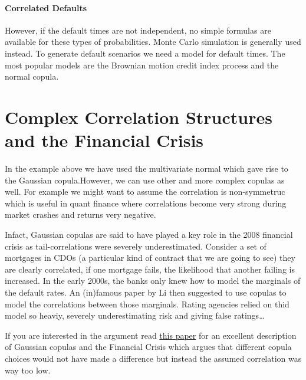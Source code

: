 \paragraph{Correlated Defaults}\label{correlated-defaults}

However, if the default times are not independent, no simple formulas
are available for these types of probabilities. Monte Carlo simulation
is generally used instead. To generate default scenarios we need a model
for default times. The most popular models are the Brownian motion
credit index process and the normal copula.

\section{Complex Correlation Structures and the Financial
Crisis}\label{complex-correlation-structures-and-the-financial-crisis}

In the example above we have used the multivariate normal which gave
rise to the Gaussian copula.However, we can use other and more complex
copulas as well. For example we might want to assume the correlation is
non-symmetruc which is useful in quant finance where correlations become
very strong during market crashes and returns very negative.

Infact, Gaussian copulas are said to have played a key role in the 2008
financial crisis as tail-correlations were severely underestimated.
Consider a set of mortgages in CDOs (a particular kind of contract that
we are going to see) they are clearly correlated, if one mortgage fails,
the likelihood that another failing is increased. In the early 2000s,
the banks only knew how to model the marginals of the default rates. An
(in)famous paper by Li then suggested to use copulas to model the
correlations between those marginals. Rating agencies relied on thid
model so heaviy, severely underestimating risk and giving false
ratings\ldots{}

If you are interested in the argument read
\href{http://timmurphy.org/2009/07/22/line-spacing-in-latex-documents/}{this paper}
for an excellent description of Gaussian copulas and the Financial
Crisis which argues that different copula choices would not have made a
difference but instead the assumed correlation was way too low.

